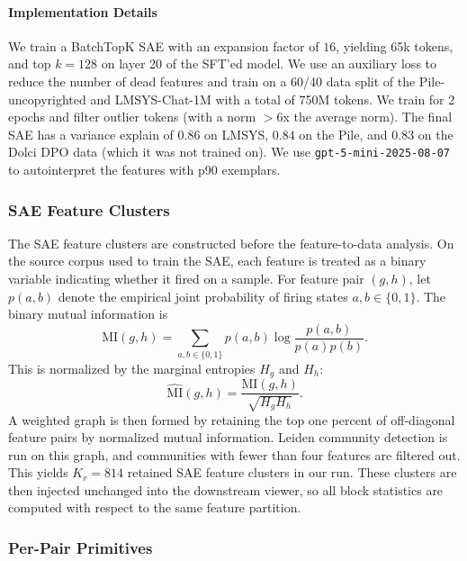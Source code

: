\documentclass{article} %
\begin{document}
\paragraph{Implementation Details} We train a BatchTopK SAE \citep{bussmann2024batchtopk} with an expansion factor of $16$, yielding 65k tokens, and top $k=128$ on layer 20 of the SFT'ed model. We use an auxiliary loss to reduce the number of dead features and train on a 60/40 data split of the Pile-uncopyrighted and LMSYS-Chat-1M with a total of 750M tokens. We train for 2 epochs and filter outlier tokens (with a norm $>6$x the average norm). The final SAE has a variance explain of $0.86$ on LMSYS, $0.84$ on the Pile, and $0.83$ on the Dolci DPO data (which it was not trained on). We use \texttt{gpt-5-mini-2025-08-07} to autointerpret the features with p90 exemplars.

\subsubsection{SAE Feature Clusters}
\label{app:ftd-feature-clusters}

The SAE feature clusters are constructed before the feature-to-data analysis. On the source corpus used to train the SAE, each feature is treated as a binary variable indicating whether it fired on a sample. For feature pair $(g,h)$, let $p(a,b)$ denote the empirical joint probability of firing states $a,b\in\{0,1\}$. The binary mutual information is
\begin{equation}
\text{MI}(g,h) = \sum_{a,b\in\{0,1\}} p(a,b)\log\frac{p(a,b)}{p(a)p(b)}.
\end{equation}
This is normalized by the marginal entropies $H_g$ and $H_h$:
\begin{equation}
\widehat{\text{MI}}(g,h) = \frac{\text{MI}(g,h)}{\sqrt{H_gH_h}}.
\end{equation}
A weighted graph is then formed by retaining the top one percent of off-diagonal feature pairs by normalized mutual information. Leiden community detection is run on this graph, and communities with fewer than four features are filtered out. This yields $K_r=814$ retained SAE feature clusters in our run. These clusters are then injected unchanged into the downstream viewer, so all block statistics are computed with respect to the same feature partition.

\subsubsection{Per-Pair Primitives}
\label{app:ftd-primitives}
\end{document}
